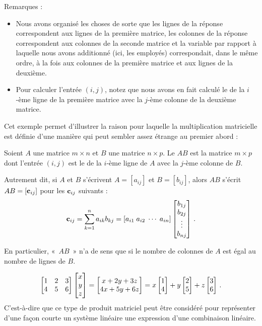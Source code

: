 \begin{myexample}
Remarques :
\begin{itemize}
\item Nous avons organisé les choses de sorte que les lignes de la réponse correspondent
aux lignes de la première matrice, les colonnes de la réponse correspondent
aux colonnes de la seconde matrice et la variable par rapport \`a laquelle nous avons additionné (ici, les employés) correspondait, dans le même ordre, à la fois aux colonnes de la première matrice et aux lignes de la deuxi\`eme.
\item Pour calculer l'entrée $(i,j)$, notez que nous avons en fait calculé le  de la $i$-\`eme ligne de la première matrice avec la $j$-\`eme colonne de la deuxième matrice.
\end{itemize}
\end{myexample}

Cet exemple permet d'illustrer la raison pour laquelle la multiplication matricielle est définie d'une manière qui peut sembler assez étrange au premier abord :

\begin{definition}
Soient $A$ une matrice $m \times n$ et $B$ une matrice $n \times p$.
Le  $AB$ est la matrice $m\times p$ dont l'entrée $(i,j)$
est le  de la $i$-ème ligne de $A$ avec la $j$-ème colonne de $B$.

Autrement dit, si $A$ et $B$ s'écrivent $A = [a_{ij}]$ et $B = [b_{ij}]$, alors $AB$ s'écrit $AB = [\mathbf{c}_{ij}]$
pour les $\mathbf{c}_{ij}$ suivants : 
$$
\mathbf{c}_{ij} = \sum_{k=1}^n a_{ik}b_{kj} = [a_{i1} \; a_{i2} \; \cdots \; a_{in}]\left[ \begin{matrix} b_{1j}\\b_{2j}\\ \vdots \\ b_{nj} \end{matrix} \right]\,.
$$

En particulier, «~$AB$~» n'a de sens que si le nombre de colonnes de $A$ est égal au nombre de lignes de $B$.
\end{definition}

\begin{myexample}
$$
\left[ \begin{matrix} 1 & 2 & 3\\ 4 & 5 & 6 \end{matrix} \right] \left[ \begin{matrix} x\\y\\z \end{matrix} \right] = \left[ \begin{matrix} x+2y+3z\\ 4x+5y+6z \end{matrix} \right]
= x\left[ \begin{matrix} 1\\4 \end{matrix} \right] + y\left[ \begin{matrix} 2\\5 \end{matrix} \right] + z\left[ \begin{matrix} 3\\6 \end{matrix} \right]\,.
$$
C'est-à-dire que ce type de produit matriciel peut être considéré pour repr\'esenter d'une fa\c{c}on courte un
système linéaire  une expression d'une combinaison linéaire.
\end{myexample}

